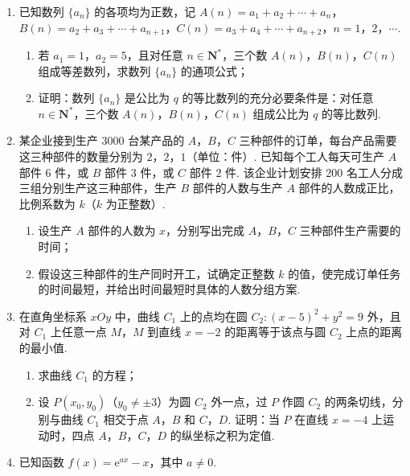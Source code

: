 \begin{description}
\begin{enumerate}[leftmargin=5pt]
        \item 已知数列 \(\{a_n\}\) 的各项均为正数，记 \(A(n)=a_1+a_2+\cdots+a_n\)，\(B(n)=a_2+a_3+\cdots+a_{n+1}\)，\(C(n)=a_3+a_4+\cdots+a_{n+2}\)，\(n=1\)，\(2\)，\(\cdots\).

\begin{enumerate}
\item 若 \(a_1=1\)，\(a_2=5\)，且对任意 \(n\in\mathbf{N}^*\)，三个数 \(A(n)\)，\(B(n)\)，\(C(n)\) 组成等差数列，求数列 \(\{a_n\}\) 的通项公式；
\item 证明：数列 \(\{a_n\}\) 是公比为 \(q\) 的等比数列的充分必要条件是：对任意 \(n\in\mathbf{N}^*\)，三个数 \(A(n)\)，\(B(n)\)，\(C(n)\) 组成公比为 \(q\) 的等比数列.
\end{enumerate}

        \item 某企业接到生产 \(3000\) 台某产品的 \(A\)，\(B\)，\(C\) 三种部件的订单，每台产品需要这三种部件的数量分别为 \(2\)，\(2\)，\(1\)（单位：件）. 已知每个工人每天可生产 \(A\) 部件 \(6\) 件，或 \(B\) 部件 \(3\) 件，或 \(C\) 部件 \(2\) 件. 该企业计划安排 \(200\) 名工人分成三组分别生产这三种部件，生产 \(B\) 部件的人数与生产 \(A\) 部件的人数成正比，比例系数为 \(k\)（\(k\) 为正整数）.

\begin{enumerate}
\item 设生产 \(A\) 部件的人数为 \(x\)，分别写出完成 \(A\)，\(B\)，\(C\) 三种部件生产需要的时间；
\item 假设这三种部件的生产同时开工，试确定正整数 \(k\) 的值，使完成订单任务的时间最短，并给出时间最短时具体的人数分组方案.
\end{enumerate}

        \item 在直角坐标系 \(xOy\) 中，曲线 \(C_1\) 上的点均在圆 \(C_2:(x-5)^2+y^2=9\) 外，且对 \(C_1\) 上任意一点 \(M\)，\(M\) 到直线 \(x=-2\) 的距离等于该点与圆 \(C_2\) 上点的距离的最小值.

\begin{enumerate}
\item 求曲线 \(C_1\) 的方程；
\item 设 \(P(x_0,y_0)\)（\(y_0\neq\pm3\)）为圆 \(C_2\) 外一点，过 \(P\) 作圆 \(C_2\) 的两条切线，分别与曲线 \(C_1\) 相交于点 \(A\)，\(B\) 和 \(C\)，\(D\). 证明：当 \(P\) 在直线 \(x=-4\) 上运动时，四点 \(A\)，\(B\)，\(C\)，\(D\) 的纵坐标之积为定值.
\end{enumerate}

        \item 已知函数 \(f(x)={\mathrm{e}}^{ax}-x\)，其中 \(a\neq0\).


\end{enumerate}
\end{description}
